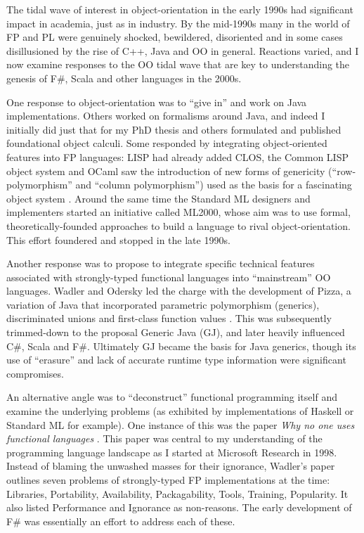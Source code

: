 \documentclass[acmsmall]{acmart}\settopmatter{}
\begin{document}
The tidal wave of interest in object-orientation in the early 1990s had significant impact in academia, just as in industry.  By the mid-1990s many in the world of FP and PL
were genuinely shocked, bewildered, disoriented and in some cases disillusioned by the rise of C++, Java and OO in general.  Reactions varied, and I now examine responses to
the OO tidal wave that are key to understanding the genesis of F\#, Scala and other languages in the 2000s. 

One response to object-orientation was to “give in” and work on Java implementations. Others worked on formalisms around Java, and indeed I initially
did just that for my PhD thesis \citep{Syme1999} and others formulated and published foundational object calculi. Some responded by integrating object-oriented
features into FP languages: LISP had already added CLOS, the Common LISP object system and OCaml saw the introduction of new forms of
genericity (“row-polymorphism” and “column polymorphism”) used as the basis for a fascinating object system \citep{Garrigue2001}. Around the same time the Standard ML
designers and implementers started an initiative called ML2000, whose aim was to use formal, theoretically-founded 
approaches to build a language to rival object-orientation. This effort foundered and stopped in the late 1990s.

Another response was to propose to integrate specific technical features associated with strongly-typed functional languages into “mainstream” OO
languages.  Wadler and Odersky led the charge with the development of Pizza, a variation of Java that incorporated parametric polymorphism (generics), discriminated
unions and first-class function values \citep{Bracha1998}.  This was subsequently trimmed-down to the proposal Generic
Java (GJ), and later heavily influenced C\#, Scala and F\#. Ultimately GJ became the basis for Java generics, though its use of “erasure” and lack of accurate
runtime type information were significant compromises. 

An alternative angle was to “deconstruct” functional programming itself and examine the underlying problems (as exhibited by implementations of Haskell
or Standard ML for example). One instance of this was the paper \textit{Why no one uses functional languages} \citep{Wadler1998}. This paper was central to
my understanding of the programming language landscape as I started at Microsoft Research in 1998.  Instead of blaming the unwashed masses for their
ignorance, Wadler’s paper outlines seven problems of strongly-typed FP implementations at the time: Libraries, Portability, Availability, Packagability, Tools,
Training, Popularity.  It also listed Performance and Ignorance as non-reasons. The early development of F\# was essentially an effort to address each of these.
\end{document}
